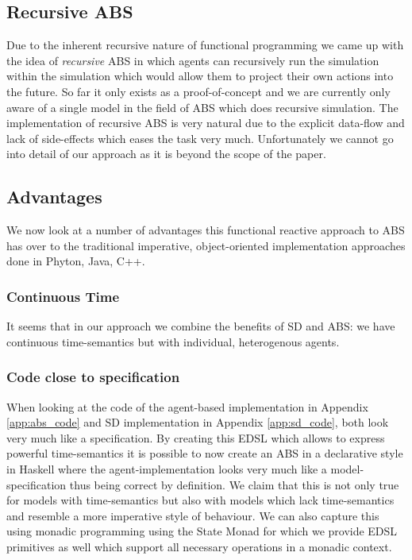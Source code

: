 \subsection{Recursive ABS}
Due to the inherent recursive nature of functional programming we came up with the idea of \textit{recursive} ABS in which agents can recursively run the simulation within the simulation which would allow them to project their own actions into the future. So far it only exists as a proof-of-concept and we are currently only aware of a single model \cite{gilmer_recursive_2000} in the field of ABS which does recursive simulation. The implementation of recursive ABS is very natural due to the explicit data-flow and lack of side-effects which eases the task very much. Unfortunately we cannot go into detail of our approach as it is beyond the scope of the paper.

\subsection{Advantages}
We now look at a number of advantages this functional reactive approach to ABS has over to the traditional imperative, object-oriented implementation approaches done in Phyton, Java, C++.

\subsubsection{Continuous Time}
It seems that in our approach we combine the benefits of SD and ABS: we have continuous time-semantics but with individual, heterogenous agents.

\subsubsection{Code close to specification}
When looking at the code of the agent-based implementation in Appendix \ref{app:abs_code} and SD implementation in Appendix \ref{app:sd_code}, both look very much like a specification. By creating this EDSL which allows to express powerful time-semantics it is possible to now create an ABS in a declarative style in Haskell where the agent-implementation looks very much like a model-specification thus being correct by definition.
We claim that this is not only true for models with time-semantics but also with models which lack time-semantics and resemble a more imperative style of behaviour. We can also capture this using monadic programming using the State Monad for which we provide EDSL primitives as well which support all necessary operations in a monadic context.

